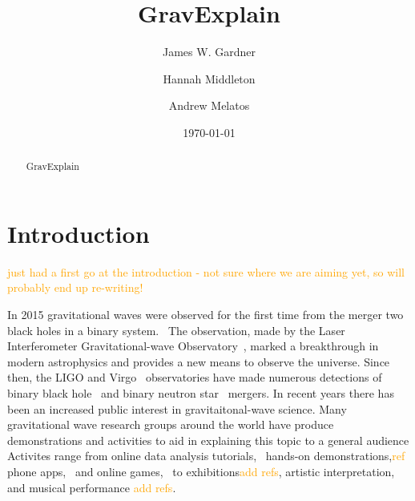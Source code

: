 \documentclass[prb,preprint]{revtex4-1}
\newcommand{\han}{\textcolor{orange}}
\begin{document}
\title{GravExplain}

\author{James W. Gardner}

\author{Hannah Middleton}
\author{Andrew Melatos}

\date{\today}

\begin{abstract}
GravExplain

\end{abstract}

\maketitle

\section{Introduction}
\han{just had a first go at the introduction - not sure where we are aiming yet, so will probably end up re-writing!}

In 2015 gravitational waves were observed for the first time from the merger two black holes in a binary system.~\cite{GW150914} 
The observation, made by the Laser Interferometer Gravitational-wave Observatory~\citep[LIGO]{AdvancedLIGO:2015}, marked a breakthrough in modern astrophysics and provides a new means to observe the universe. 
Since then, the LIGO and Virgo~\cite{AdvancedVirgo:2015} observatories have made numerous detections of binary black hole~\cite{GW151226,GW170104,GW170814} and binary neutron star~\cite{GW170817,GW170817multi} mergers. 
In recent years there has been an increased public interest in gravitaitonal-wave science. 
Many gravitational wave research groups around the world have produce demonstrations and activities to aid in explaining this topic to a general audience
Activites range from online data analysis tutorials,~\cite{GWOSC:online,LOSC:2015} hands-on demonstrations,\han{ref} phone apps,~\cite{LaserLabs:online,SciVR:online} and online games,~\cite{BlackHoleHunter:online} to exhibitions\han{add refs}, artistic interpretation, and musical performance \han{add refs}. 
\end{document}
